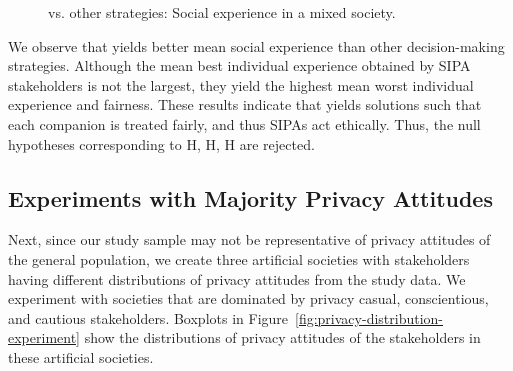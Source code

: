 \begin{figure}[!tb]
    \centering
    \caption{\frameworkAinur vs. other strategies: Social experience in a mixed society.}
    \label{fig:weighted-experience-plot}
\end{figure}


We observe that \frameworkAinur yields better mean social experience than  other decision-making strategies. Although the mean best individual experience obtained by \frameworkAinur SIPA stakeholders is not the largest, they yield the highest mean worst individual experience and fairness. 
These results indicate that \frameworkAinur yields solutions such that each companion is treated fairly, and thus \frameworkAinur SIPAs act ethically. Thus, the null hypotheses corresponding to H, H, H are rejected.


\subsection{Experiments with Majority Privacy Attitudes}
Next, since our study sample may not be representative of privacy attitudes of the general population, we create three artificial societies with stakeholders having different distributions of privacy attitudes from the study data. 
We experiment with societies that are dominated by privacy casual, conscientious, and  cautious stakeholders. Boxplots in Figure~\ref{fig:privacy-distribution-experiment} show the distributions of privacy attitudes of the stakeholders in these artificial societies. 

